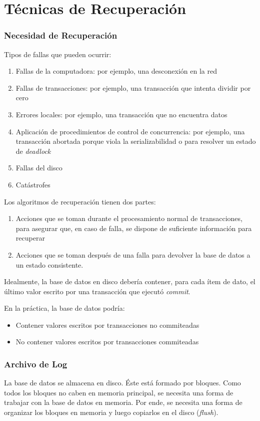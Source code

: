 \documentclass[a4paper, twoside]{article}
\begin{document}
\newpage
\part{Técnicas de Recuperación}
\section{Necesidad de Recuperación}
Tipos de fallas que pueden ocurrir:
\begin{enumerate}
	\item Fallas de la computadora: por ejemplo, una desconexión en la red
	\item Fallas de transacciones: por ejemplo, una transacción que intenta dividir por cero
	\item Errores locales: por ejemplo, una transacción que no encuentra datos
	\item Aplicación de procedimientos de control de concurrencia: por ejemplo, una transacción abortada porque viola la serializabilidad o para resolver un estado de \emph{deadlock}
	\item Fallas del disco
	\item Catástrofes
\end{enumerate}

Los algoritmos de recuperación tienen dos partes:
\begin{enumerate}
	\item Acciones que se toman durante el procesamiento normal de transacciones, para asegurar que, en caso de falla, se dispone de suficiente información para recuperar
	\item Acciones que se toman después de una falla para devolver la base de datos a un estado consistente.
\end{enumerate}

Idealmente, la base de datos en disco debería contener, para cada ítem de dato, el último valor escrito por una transacción que ejecutó \emph{commit}.

En la práctica, la base de datos podría:
\begin{itemize}
	\item Contener valores escritos por transacciones no commiteadas
	\item No contener valores escritos por transacciones commiteadas
\end{itemize}

\section{Archivo de Log}
La base de datos se almacena en disco. Éste está formado por bloques. Como todos los bloques no caben en memoria principal, se necesita una forma de trabajar con la base de datos en memoria. Por ende, se necesita una forma de organizar los bloques en memoria y luego copiarlos en el disco (\emph{flush}).
\end{document}
